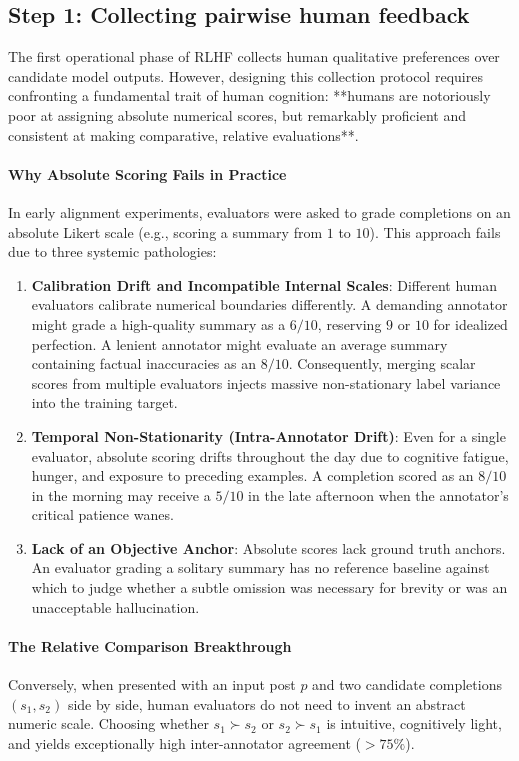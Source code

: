 \documentclass[../../main.tex]{subfiles}
\begin{document}
\subsection{Step 1: Collecting pairwise human feedback}
\label{subsec:step1_collecting_human_feedback}

The first operational phase of RLHF collects human qualitative preferences over candidate model outputs. However, designing this collection protocol requires confronting a fundamental trait of human cognition: **humans are notoriously poor at assigning absolute numerical scores, but remarkably proficient and consistent at making comparative, relative evaluations**.

\paragraph{Why Absolute Scoring Fails in Practice}
In early alignment experiments, evaluators were asked to grade completions on an absolute Likert scale (e.g., scoring a summary from $1$ to $10$). This approach fails due to three systemic pathologies:
\begin{enumerate}
    \item \textbf{Calibration Drift and Incompatible Internal Scales}: Different human evaluators calibrate numerical boundaries differently. A demanding annotator might grade a high-quality summary as a $6/10$, reserving $9$ or $10$ for idealized perfection. A lenient annotator might evaluate an average summary containing factual inaccuracies as an $8/10$. Consequently, merging scalar scores from multiple evaluators injects massive non-stationary label variance into the training target.
    \item \textbf{Temporal Non-Stationarity (Intra-Annotator Drift)}: Even for a single evaluator, absolute scoring drifts throughout the day due to cognitive fatigue, hunger, and exposure to preceding examples. A completion scored as an $8/10$ in the morning may receive a $5/10$ in the late afternoon when the annotator's critical patience wanes.
    \item \textbf{Lack of an Objective Anchor}: Absolute scores lack ground truth anchors. An evaluator grading a solitary summary has no reference baseline against which to judge whether a subtle omission was necessary for brevity or was an unacceptable hallucination.
\end{enumerate}

\paragraph{The Relative Comparison Breakthrough}
Conversely, when presented with an input post $p$ and two candidate completions $(s_1, s_2)$ side by side, human evaluators do not need to invent an abstract numeric scale. Choosing whether $s_1 \succ s_2$ or $s_2 \succ s_1$ is intuitive, cognitively light, and yields exceptionally high inter-annotator agreement ($>75\%$).
\end{document}
